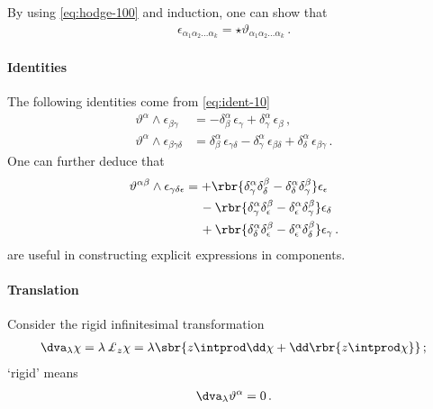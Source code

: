 \documentclass[a4paper]{article}
\begin{document}
By using \cref{eq:hodge-100} and induction, one can show that
\begin{align}
\epsilon_{\alpha_{1}\alpha_{2}\ldots \alpha_{k}} =
\star \vartheta_{\alpha_{1}\alpha_{2}\ldots \alpha_{k}}\,.
\end{align}

\paragraph{Identities}
The following identities come from \cref{eq:ident-10}
\begin{align}
\vartheta^{\alpha}\wedge\epsilon_{\beta\gamma}
&= -\delta^{\alpha}_{\beta}\,\epsilon_{\gamma}
	+\delta^{\alpha}_{\gamma}\,\epsilon_{\beta}\,,
\label{eq:id-cof-10}
\\
\vartheta^{\alpha}\wedge\epsilon_{\beta\gamma\delta} &=
\delta^{\alpha}_{\beta}\,\epsilon_{\gamma\delta} -
\delta^{\alpha}_{\gamma}\,\epsilon_{\beta\delta} +
\delta^{\alpha}_{\delta}\,\epsilon_{\beta\gamma}\,.
\label{eq:id-cof-20}
\end{align}
One can further deduce that
\begin{align}
\begin{split}
\vartheta^{\alpha\beta}\wedge\epsilon_{\gamma\delta\epsilon} &= +
\rbr{\delta^{\alpha}_{\gamma}\delta^{\beta}_{\delta}-
	\delta^{\alpha}_{\delta}\delta^{\beta}_{\gamma}}\epsilon_{\epsilon}
\\
&\quad\, -
\rbr{\delta^{\alpha}_{\gamma}\delta^{\beta}_{\epsilon}-
	\delta^{\alpha}_{\epsilon}\delta^{\beta}_{\gamma}}\epsilon_{\delta}
\\
&\quad\, +
\rbr{\delta^{\alpha}_{\delta}\delta^{\beta}_{\epsilon}-
	\delta^{\alpha}_{\epsilon}\delta^{\beta}_{\delta}}\epsilon_{\gamma}\,.
\end{split}
\label{eq:id-cof-30}
\end{align}
 are useful in constructing explicit 
expressions in components.

\paragraph{Translation}

Consider the rigid infinitesimal transformation
\begin{align}
\dva_{\lambda}\chi = \lambda\, \pounds_z \chi =
	\lambda\sbr{z\intprod\dd\chi + \dd\rbr{z\intprod\chi}}\,;
\end{align}
`rigid' means
\begin{align}
\dva_{\lambda} \vartheta^{\alpha} = 0\,.
\end{align}
\end{document}
